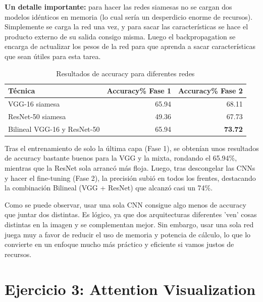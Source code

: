\documentclass[11pt,spanish,listoffigures,listoftables]{tfgetsinf}
\begin{document}
\textbf{Un detalle importante:} para hacer las redes siamesas no se cargan dos modelos idénticos en memoria (lo cual sería un desperdicio enorme de recursos). Simplemente se carga la red una vez, y para sacar las características se hace el producto externo de su salida consigo misma. Luego el backpropagation se encarga de actualizar los pesos de la red para que aprenda a sacar características que sean útiles para esta tarea.


\begin{table}[H]
\centering
\begin{tabular}{lrr}
	\toprule
	\textbf{Técnica} & \textbf{Accuracy\% Fase 1} & \textbf{Accuracy\% Fase 2} \\
	\midrule
  VGG-16 siamesa & 65.94 & 68.11 \\
  ResNet-50 siamesa & 49.36 & 67.73 \\
  Bilineal VGG-16 y ResNet-50 & 65.94 & \textbf{73.72} \\
	\bottomrule
\end{tabular}
\caption{Resultados de accuracy para diferentes redes}
\label{tab:accuracy_ej2}
\end{table}

Tras el entrenamiento de solo la última capa (Fase 1), se obtenían unos resultados de accuracy bastante buenos para la VGG y la mixta, rondando el 65.94\%, mientras que la ResNet sola arrancó más floja. Luego, tras descongelar las CNNs y hacer el fine-tuning (Fase 2), la precisión subió en todos los frentes, destacando la combinación Bilineal (VGG + ResNet) que alcanzó casi un 74\%.

Como se puede observar, usar una sola CNN consigue algo menos de accuracy que juntar dos distintas. Es lógico, ya que dos arquitecturas diferentes 'ven' cosas distintas en la imagen y se complementan mejor. Sin embargo, usar una sola red juega muy a favor de reducir el uso de memoria y potencia de cálculo, lo que lo convierte en un enfoque mucho más práctico y eficiente si vamos justos de recursos.

\clearpage

\section{Ejercicio 3: Attention Visualization}

\end{document}

